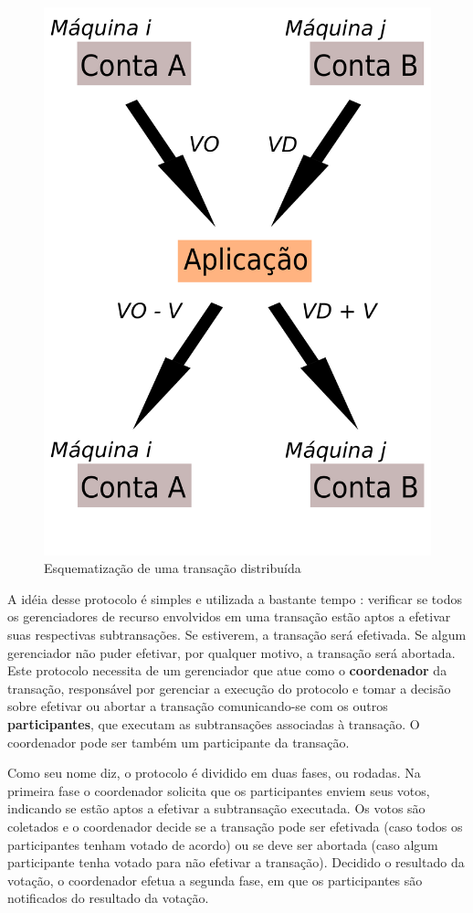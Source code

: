 \documentclass[11pt,twoside,a4paper]{book}
\begin{document}
\begin{figure}
  \centering
  \includegraphics[width=.40\textwidth]{transacao_distribuida} 
  \caption{Esquematização de uma transação distribuída}
  \label{fig:transacao_distribuida} 
\end{figure}

A idéia desse protocolo é simples e utilizada a bastante tempo \cite{2pc}: verificar se todos os gerenciadores de recurso envolvidos em uma transação estão aptos a efetivar suas respectivas subtransações. Se estiverem, a transação será efetivada. Se algum gerenciador não puder efetivar, por qualquer motivo, a transação será abortada. Este protocolo necessita de um gerenciador que atue como o \textbf{coordenador} da transação, responsável por gerenciar a execução do protocolo e tomar a decisão sobre efetivar ou abortar a transação comunicando-se com os outros \textbf{participantes}, que executam as subtransações associadas à transação. O coordenador pode ser também um participante da transação.

Como seu nome diz, o protocolo é dividido em duas fases, ou rodadas. Na primeira fase o coordenador solicita que os participantes enviem seus votos, indicando se estão aptos a efetivar a subtransação executada. Os votos são coletados e o coordenador decide se a transação pode ser efetivada (caso todos os participantes tenham votado de acordo) ou se deve ser abortada (caso algum participante tenha votado para não efetivar a transação). Decidido o resultado da votação, o coordenador efetua a segunda fase, em que os participantes são notificados do resultado da votação. 
\end{document}
